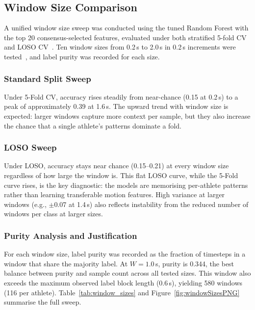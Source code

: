 \documentclass[12pt,a4paper]{cibb}
\begin{document}
\subsection{Window Size Comparison}

A unified window size sweep was conducted using the tuned Random Forest with the top 20 consensus-selected features, evaluated under both stratified 5-fold CV and LOSO CV~\cite{10962074}. Ten window sizes from 0.2\,s to 2.0\,s in 0.2\,s increments were tested~\cite{10689691}, and label purity was recorded for each size.

\subsubsection{Standard Split Sweep}
Under 5-Fold CV, accuracy rises steadily from near-chance (0.15 at 0.2\,s) to a peak of approximately 0.39 at 1.6\,s. The upward trend with window size is expected: larger windows capture more context per sample, but they also increase the chance that a single athlete's patterns dominate a fold.

\subsubsection{LOSO Sweep}
Under LOSO, accuracy stays near chance (0.15--0.21) at every window size regardless of how large the window is. This flat LOSO curve, while the 5-Fold curve rises, is the key diagnostic: the models are memorising per-athlete patterns rather than learning transferable motion features. High variance at larger windows (e.g., $\pm$0.07 at 1.4\,s) also reflects instability from the reduced number of windows per class at larger sizes.

\subsubsection{Purity Analysis and Justification}
For each window size, label purity was recorded as the fraction of timesteps in a window that share the majority label. At $W = 1.0$\,s, purity is 0.344, the best balance between purity and sample count across all tested sizes. This window also exceeds the maximum observed label block length (0.6\,s), yielding 580 windows (116 per athlete). Table~\ref{tab:window_sizes} and Figure~\ref{fig:windowSizesPNG} summarise the full sweep.
\end{document}
